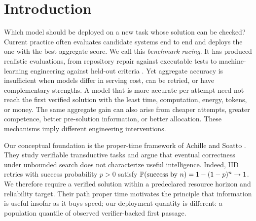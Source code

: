 \begin{abstract}
Model selection for verifiable tasks should ask how much resource is required
to obtain a verified solution, not only which model has the highest one-shot
accuracy.  We formalize this objective as a reliability-targeted quantile of
verified first-passage resource, measured in a predeclared unit such as time,
tokens, energy, or money.  Simultaneous finite-sample confidence bands provide
a conservative rule for admitting and comparing a finite menu of agent
systems, including an explicit no-winner outcome.  To explain measured
differences, we introduce a batched tool-allocation process and isolate
a restricted reference-combination regime.  In that regime, expected log
conditional first-passage resource separates exactly into relative mean retry
cost, focused competence, signal information about appropriate tool use, and
batched tool-policy mismatch.  Controlled Qwen2.5-Coder
experiments recover the one-dispatch special case with near-unit inverse-share
scaling and decision-accurate accounting while rejecting exact closure; public
benchmark traces further show that reliability targets are often unattained.
Thus verified proper time selects the deployment, whereas the four-term
identity audits why that selection succeeds or fails.
\end{abstract}

\section{Introduction}
\label{sec:introduction}

Which model should be deployed on a new task whose solution can be checked?
Current practice often evaluates candidate systems end to end and deploys the
one with the best aggregate score.  We call this \emph{benchmark racing}.  It
has produced realistic evaluations, from repository repair against executable
tests to machine-learning engineering against held-out criteria
\citep{jimenez2024swebench,chan2024mlebench}.  Yet aggregate accuracy is
insufficient when models differ in serving cost, can be retried, or have
complementary strengths.  A model that is more accurate per attempt need not
reach the first verified solution with the least time, computation, energy,
tokens, or money.  The same aggregate gain can also arise from cheaper attempts,
greater competence, better pre-solution information, or better allocation.
These mechanisms imply different engineering interventions.

Our conceptual foundation is the proper-time framework of Achille and Soatto
\citep{achille2025agents}.  They study verifiable transductive tasks and argue
that eventual correctness under unbounded search does not characterize useful
intelligence.  Indeed, IID retries with success probability \(p>0\) satisfy
\(\mathbb{P}(\text{success by }n)=1-(1-p)^n\to1\).  We therefore require a verified
solution within a predeclared resource horizon and reliability target.  Their
path proper time motivates the principle that information is useful insofar as
it buys speed; our deployment quantity is different: a population quantile of
observed verifier-backed first passage.

